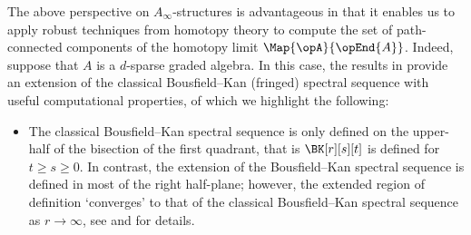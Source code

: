 \documentclass[a4paper]{amsart}
\newcounter{rpage}
\newcommand{\rpage}{\value{rpage}} 		%
\newcommand{\rescale}{0.3}			%
\newcommand{\margen}{0.1}			%
\newcommand{\abajo}{5}				%
\newcommand{\arriba}{5}
\newcommand{\derecha}{5} 			%
\begin{document}
The above perspective on $A_\infty$-structures is advantageous in that it
enables us to apply robust techniques from homotopy theory to compute the set of
path-connected components of the homotopy limit $\Map{\opA}{\opEnd{A}}$. Indeed,
suppose that $A$ is a $d$-sparse graded algebra. In this case, the results in
\cite{Mur20b} provide an extension of the classical Bousfield--Kan (fringed)
spectral sequence \cite[Ch.~IX, Sec.~4]{BK72} with useful computational
properties, of which we highlight the following:
\begin{itemize}
\item The classical Bousfield--Kan spectral sequence is only defined on the
  upper-half of the bisection of the first quadrant, that is $\BK[r][s][t]$ is
  defined for $t\geq s\geq 0$. In contrast, the extension of the Bousfield--Kan
  spectral sequence is defined in most of the right half-plane; however, the
  extended region of definition `converges' to that of the classical
  Bousfield--Kan spectral sequence as ${r\to\infty}$, see
   and \cite{Mur20b} for details.
  \begin{figure}[t] %
    \setcounter{rpage}{5}    
\end{figure}
\end{itemize}
\end{document}
